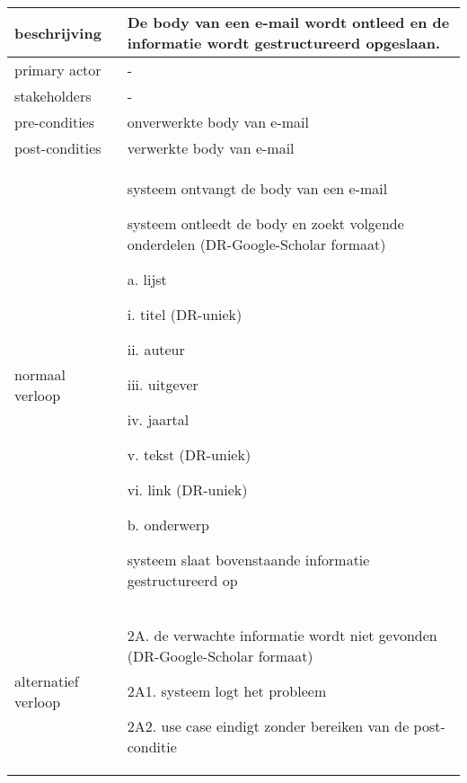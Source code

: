 \newpage
\begin{table}[ptb]
    \centering
    \begin{tabular}{ | m{5cm} | m{10cm}| } 
        \hline
        \rowcolor{lightgray}
        beschrijving & De body van een e-mail wordt ontleed en de informatie wordt gestructureerd opgeslaan. \\ 
        \hline
        primary actor & - \\ 
        \hline
        stakeholders & - \\ 
        \hline
        pre-condities & onverwerkte body van e-mail \\ 
        \hline
        post-condities & verwerkte body van e-mail \\ 
        \hline
        normaal verloop & 
        \begin{enumerate}
            \item systeem ontvangt de body van een e-mail
            \item systeem ontleedt de body en zoekt volgende onderdelen (DR-Google-Scholar formaat)
            \begin{description}
                \item a. lijst
                \begin{description}
                    \item i. titel (DR-uniek)
                    \item ii. auteur
                    \item iii. uitgever
                    \item iv. jaartal
                    \item v. tekst (DR-uniek)
                    \item vi. link (DR-uniek)
                \end{description}
                \item b. onderwerp
            \end{description}
            \item systeem slaat bovenstaande informatie gestructureerd op
        \end{enumerate} \\ 
        \hline
        alternatief verloop & 
        \begin{description}
            \item 2A. de verwachte informatie wordt niet gevonden (DR-Google-Scholar formaat)
            \item 2A1. systeem logt het probleem
            \item 2A2. use case eindigt zonder bereiken van de post-conditie

\end{description}
\end{tabular}
\end{table}
